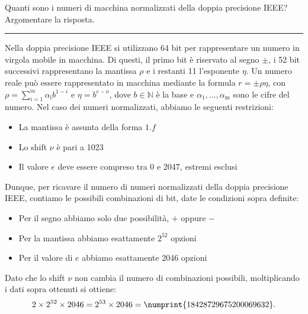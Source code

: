 Quanti sono i numeri di macchina normalizzati della doppia precisione IEEE? Argomentare la risposta.

\hspace*{\fill}
\par\noindent\rule{\textwidth}{0.4pt}
\hspace*{\fill}

Nella doppia precisione IEEE si utilizzano 64 bit per rappresentare un numero in virgola mobile in macchina.
Di questi, il primo bit è riservato al segno $\pm$, i 52 bit successivi rappresentano la mantissa $\rho$ e i restanti 11 l'esponente $\eta$.
Un numero reale può essere rappresentato in macchina mediante la formula $r=\pm \rho \eta$, con $\rho=\sum_{i=1}^{m} \alpha_\mathrm{i}b^{1-i}$ e $\eta=b^{e-\nu}$, dove $b \in\mathbb{N}$ è la base e $\alpha_\mathrm{1},\dots,\alpha_\mathrm{m}$ sono le cifre del numero.
Nel caso dei numeri normalizzati, abbiamo le seguenti restrizioni:
\begin{itemize}
	\item La mantissa è assunta della forma $1.f$
	\item Lo shift $\nu$ è pari a 1023
	\item Il valore $e$ deve essere compreso tra 0 e 2047, estremi esclusi
\end{itemize}
Dunque, per ricavare il numero di numeri normalizzati della doppia precisione IEEE, contiamo le possibili combinazioni di bit, date le condizioni sopra definite:
\begin{itemize}
	\item Per il segno abbiamo solo due possibilità, $+$ oppure $-$
	\item Per la mantissa abbiamo esattamente $2^{52}$ opzioni
	\item Per il valore di $e$ abbiamo esattamente 2046 opzioni
\end{itemize}
Dato che lo shift $\nu$ non cambia il numero di combinazioni possibili, moltiplicando i dati sopra ottenuti si ottiene:
$$2\times2^{52}\times2046=2^{53}\times2046=\numprint{18428729675200069632}.$$
